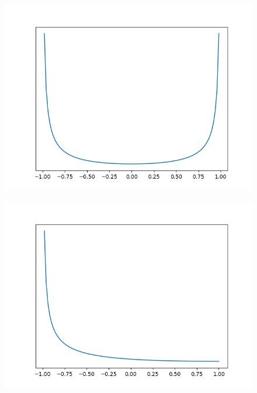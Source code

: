 \begin{figure}[!h]
    \centering
    \includegraphics[scale=0.5]
    {./content/figures/dists/beta_0.3_0.3}
    \caption{}
    \label{fig:beta-0.3-0.3}
\end{figure}

\begin{figure}[!h]
    \centering
    \includegraphics[scale=0.5]
    {./content/figures/dists/beta_0.3_3}
    \caption{}
    \label{fig:beta-0.3-3}
\end{figure}

